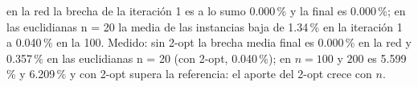 {en la red la brecha de la iteración 1 es a lo sumo 0.000\,\% y la final es 0.000\,\%; en las euclidianas n = 20 la media de las instancias baja de 1.34\,\% en la iteración 1 a 0.040\,\% en la 100.}
{Medido: sin 2-opt la brecha media final es 0.000\,\% en la red y 0.357\,\% en las euclidianas n = 20 (con 2-opt, 0.040\,\%); en $n = 100$ y $200$ es 5.599\,\% y 6.209\,\% y con 2-opt supera la referencia: el aporte del 2-opt crece con $n$.}
